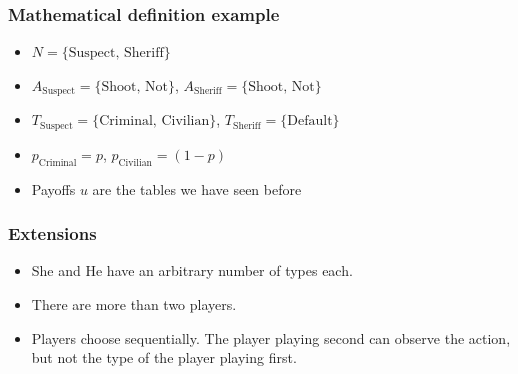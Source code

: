 \documentclass[11pt]{beamer}
\begin{document}
\begin{frame}
    \frametitle{{Mathematical definition example}}
    \begin{itemize}
        \item $N = \{\text{Suspect, Sheriff}\}$
        \item $A_{\text{Suspect}} = \{\text{Shoot, Not}\}$, $A_{\text{Sheriff}} = \{\text{Shoot, Not}\}$
        \item $T_{\text{Suspect}} = \{\text{Criminal, Civilian}\}$, $T_{\text{Sheriff}} = \{ \text{Default} \}$
        \item $p_{\text{Criminal}} = p$, $p_{\text{Civilian}} = (1 - p)$
        \item Payoffs $u$ are the tables we have seen before
    \end{itemize}
\end{frame}


\begin{frame}
    \frametitle{Extensions}
    \begin{itemize}
        \item She and He have an arbitrary number of types each.
        \item There are more than two players.
        \item Players choose sequentially. The player playing second can observe the action, but
        not the type of the player playing first.

    \end{itemize}
\end{frame}
\end{document}

